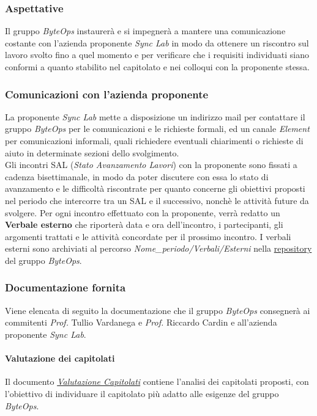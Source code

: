 \subsubsection{Aspettative}
Il gruppo \textit{ByteOps} instaurerà e si impegnerà a mantere una comunicazione costante con l'azienda proponente \textit{Sync Lab} in modo da ottenere un riscontro sul lavoro svolto fino a quel momento e per verificare che i requisiti individuati siano conformi a quanto stabilito nel capitolato e nei colloqui con la proponente stessa.\\

\subsubsection{Comunicazioni con l'azienda proponente}
La proponente \textit{Sync Lab} mette a disposizione un indirizzo mail per contattare il gruppo \textit{ByteOps} per le comunicazioni e le richieste formali, ed un canale \textit{Element} per comunicazioni informali, quali richiedere eventuali chiarimenti o richieste di aiuto in determinate sezioni dello svolgimento.\\
Gli incontri SAL (\textit{Stato Avanzamento Lavori}) con la proponente sono fissati a cadenza bisettimanale, in modo da poter discutere con essa lo stato di avanzamento e le difficoltà riscontrate per quanto concerne gli obiettivi proposti nel periodo che intercorre tra un SAL e il successivo, nonchè le attività future da svolgere.
Per ogni incontro effettuato con la proponente, verrà redatto un \textbf{Verbale esterno} che riporterà data e ora dell'incontro, i partecipanti, gli argomenti trattati e le attività concordate per il prossimo incontro.
I verbali esterni sono archiviati al percorso \textit{Nome\_periodo/Verbali/Esterni} nella \href{https://github.com/ByteOps-swe/Documents}{repository} del gruppo \textit{ByteOps}.

\subsubsection {Documentazione fornita}
Viene elencata di seguito la documentazione che il gruppo \textit{ByteOps} consegnerà ai commitenti \textit{Prof.} Tullio Vardanega e \textit{Prof.} Riccardo Cardin e all'azienda proponente \textit{Sync Lab}.

\paragraph{Valutazione dei capitolati}
Il documento \href{https://github.com/ByteOps-swe/Documents/blob/main/Candidatura/Valutazione%20Capitolati.pdf}{\textit{Valutazione Capitolati}} contiene l'analisi dei capitolati proposti, con l'obiettivo di individuare il capitolato più adatto alle esigenze del gruppo \textit{ByteOps}.

